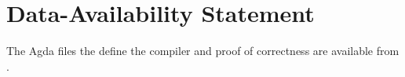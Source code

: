 \documentclass[sigplan,screen]{acmart}
\begin{document}
\section{Data-Availability Statement}

The Agda files the define the compiler and proof of correctness are
available from \citet{Siek:2025aa}.

\balance





\end{document}

